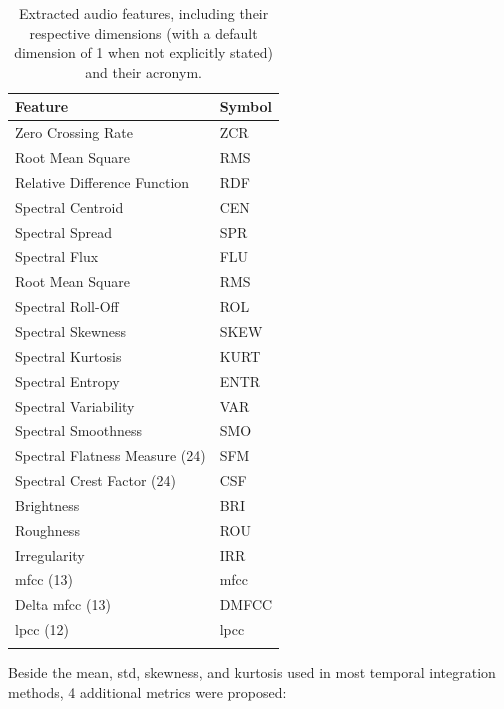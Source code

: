\begin{table}[ht!]
    \caption[Features extracted in the BDLib2 dataset]{Extracted audio features, including their respective dimensions (with a default dimension of 1 when not explicitly stated) and their acronym.}
    \label{table:BDLib2_features_extracted}
    \centering
    \begin{tabular}{
        >{\centering\arraybackslash}m{} | >{\centering\arraybackslash}m{}}
        \Xhline{2\arrayrulewidth}
        \rowcolor{lightgray}
        \textbf{Feature} & \textbf{Symbol} \\
        \hline
        Zero Crossing Rate & ZCR \\
        Root Mean Square & RMS \\
        Relative Difference Function & RDF  \\
        Spectral Centroid  & CEN \\
        Spectral Spread & SPR\\
        Spectral Flux & FLU \\
        Root Mean Square & RMS \\
        Spectral Roll-Off & ROL \\
        Spectral Skewness & SKEW \\
        Spectral Kurtosis & KURT \\
        Spectral Entropy & ENTR \\
        Spectral Variability & VAR \\
        Spectral Smoothness & SMO \\
        Spectral Flatness Measure (24) & SFM \\
        Spectral Crest Factor (24) & CSF \\
        Brightness  & BRI \\
        Roughness & ROU \\
        Irregularity & IRR \\
        \gls{mfcc} (13) & \gls{mfcc} \\
        Delta \gls{mfcc} (13) & DMFCC \\
        \gls{lpcc} (12) & \gls{lpcc} \\
        \Xhline{2\arrayrulewidth}
    \end{tabular}
\end{table}

 Beside the mean, \gls{std}, skewness, and kurtosis used in most temporal integration methods, 4 additional metrics were proposed:

